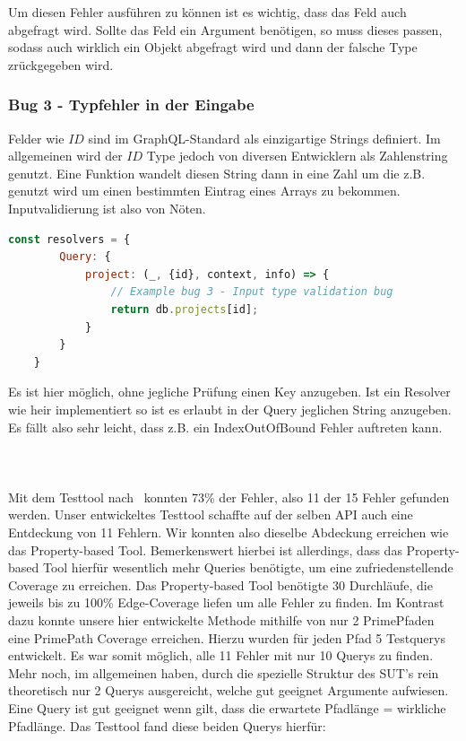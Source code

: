 Um diesen Fehler ausführen zu können ist es wichtig, dass das Feld auch abgefragt wird.
Sollte das Feld ein Argument benötigen, so muss dieses passen, sodass auch wirklich ein Objekt abgefragt wird und dann der falsche Type zrückgegeben wird.

\subsubsection{Bug 3 - Typfehler in der Eingabe}

Felder wie $ID$ sind im GraphQL-Standard als einzigartige Strings definiert.
Im allgemeinen wird der $ID$ Type jedoch von diversen Entwicklern als Zahlenstring genutzt.
Eine Funktion wandelt diesen String dann in eine Zahl um die z.B. genutzt wird um einen bestimmten Eintrag eines Arrays zu bekommen.
Inputvalidierung ist also von Nöten.

\begin{lstlisting}[language=javascript]
    const resolvers = {
        Query: {
            project: (_, {id}, context, info) => {
                // Example bug 3 - Input type validation bug
                return db.projects[id];
            }
        }
    }
\end{lstlisting}

Es ist hier möglich, ohne jegliche Prüfung einen Key anzugeben.
Ist ein Resolver wie heir implementiert so ist es erlaubt in der Query jeglichen String anzugeben.
Es fällt also sehr leicht, dass z.B. ein IndexOutOfBound Fehler auftreten kann.
\\
\\
\\
\\

Mit dem Testtool nach~\cite[Property-based Testing]{property-based-testing} konnten 73\% der Fehler, also 11 der 15 Fehler gefunden  werden.
Unser entwickeltes Testtool schaffte auf der selben API auch eine Entdeckung von 11 Fehlern.
Wir konnten also dieselbe Abdeckung erreichen wie das Property-based Tool.
Bemerkenswert hierbei ist allerdings, dass das Property-based Tool hierfür wesentlich mehr Queries benötigte, um eine zufriedenstellende
Coverage zu erreichen.
Das Property-based Tool benötigte 30 Durchläufe, die jeweils bis zu 100\% Edge-Coverage liefen um alle Fehler zu finden.
Im Kontrast dazu konnte unsere hier entwickelte Methode mithilfe von nur 2 PrimePfaden eine PrimePath Coverage erreichen.
Hierzu wurden für jeden Pfad 5 Testquerys entwickelt.
Es war somit möglich, alle 11 Fehler mit nur 10 Querys zu finden. Mehr noch, im allgemeinen haben, durch die spezielle Struktur des SUT's
rein theoretisch nur 2 Querys ausgereicht, welche gut geeignet Argumente aufwiesen.
Eine Query ist gut geeignet wenn gilt, dass die erwartete Pfadlänge = wirkliche Pfadlänge.
Das Testtool fand diese beiden Querys hierfür: \\


